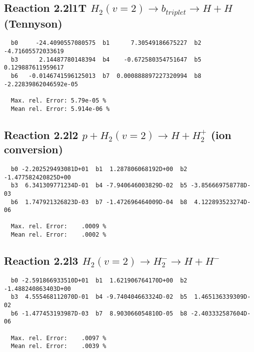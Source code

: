 \documentclass[12pt]{article}
\begin{document}
\subsection{
Reaction 2.2l1T
$  H_2(v=2) \rightarrow b_{triplet}\rightarrow H + H $ (Tennyson)
}


\begin{small}\begin{verbatim}
  b0     -24.4090557080575  b1      7.30549186675227  b2     -4.71605572033619
  b3      2.14487780148394  b4    -0.672580354751647  b5     0.129887611959617
  b6   -0.0146741596125013  b7  0.000888897227320994  b8 -2.22839862046592e-05

  Max. rel. Error: 5.79e-05 %
  Mean rel. Error: 5.914e-06 %
\end{verbatim}\end{small}


\subsection{
Reaction 2.2l2
$ p + H_2(v=2) \rightarrow H + H_2^+$ (ion conversion)
}


\begin{small}\begin{verbatim}
  b0 -2.202529493081D+01  b1  1.287806068192D+00  b2 -1.477582420825D+00
  b3  6.341309771234D-01  b4 -7.940646003829D-02  b5 -3.856669758778D-03
  b6  1.747921326823D-03  b7 -1.472696464009D-04  b8  4.122893523274D-06

  Max. rel. Error:    .0009 %
  Mean rel. Error:    .0002 %
\end{verbatim}\end{small}


\subsection{
Reaction 2.2l3
 $ H_2(v=2) \rightarrow H_2^- \rightarrow H + H^-$
}


\begin{small}\begin{verbatim}
  b0 -2.591866933510D+01  b1  1.621906764170D+00  b2 -1.488240863403D+00
  b3  4.555468112070D-01  b4 -9.740404663324D-02  b5  1.465136339309D-02
  b6 -1.477453193987D-03  b7  8.903066054810D-05  b8 -2.403332587604D-06

  Max. rel. Error:    .0097 %
  Mean rel. Error:    .0039 %
\end{verbatim}\end{small}
\end{document}
